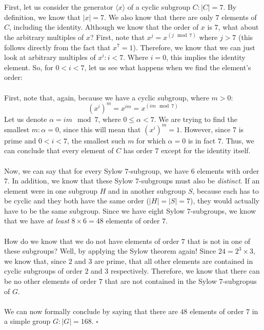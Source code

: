 \documentclass[letterpaper]{article}
\newcommand*{\QED}{\hfill\ensuremath{\square}}%
\begin{document}
\\ \\
First, let us consider the generator $ \langle x \rangle $ of a cyclic subgroup $ C : |C| = 7 $.
By definition, we know that $ |x| = 7 $.
We also know that there are only $ 7 $ elements of $ C $, including the identity.
Although we know that the order of $ x $ is $ 7 $, what about the arbitrary multiples of $ x $?
First, note that $ x^j = x^{(j \mod{7})} $ where $ j > 7 $ (this follows directly from the fact that $ x^7 = 1 $).
Therefore, we know that we can just look at arbitrary multiples of $ x^i : i < 7 $.
Where $ i = 0 $, this implies the identity element.
So, for $ 0 < i < 7 $, let us see what happens when we find the element's order:
\\ \\
First, note that, again, because we have a cyclic subgroup, where $ m > 0 $:
\[
{(x^i)}^m = x^{im} = x^{(im \mod{7})}
\]
Let us denote $ \alpha = im \mod{7} $, where $ 0 \leq \alpha < 7 $.
We are trying to find the smallest $ m : \alpha = 0 $, since this will mean that $ {(x^i)}^m = 1 $.
However, since $ 7 $ is prime and $ 0 < i < 7 $, the smallest such $ m $ for which $ \alpha = 0 $ is in fact $ 7 $.
Thus, we can conclude that every element of $ C $ has order $ 7 $ except for the identity itself.
\\ \\
Now, we can say that for every Sylow $ 7 $-subgroup, we have $ 6 $ elements with order $ 7 $.
In addition, we know that these Sylow $ 7 $-subgroups must also be \textit{distinct}.
If an element were in one subgroup $ H $ and in another subgroup $ S $, because each has to be cyclic and they both have the same order ($ |H| = |S| = 7 $), they would actually have to be the same subgroup.
Since we have eight Sylow $ 7 $-subgroups, we know that we have \textit{at least} $ 8 \times 6 = 48 $ elements of order $ 7 $.
\\ \\
How do we know that we do not have elements of order $ 7 $ that is not in one of these subgroups?
Well, by applying the Sylow theorem again!
Since $ 24 = 2^3 \times 3 $, we know that, since $ 2 $ and $ 3 $ are prime, that all other elements are contained in cyclic subgroups of order $ 2 $ and $ 3 $ respectively.
Therefore, we know that there can be no other elements of order $ 7 $ that are not contained in the Sylow $ 7 $-subgropus of $ G $.
\\ \\
We can now formally conclude by saying that there are $ 48 $ elements of order $ 7 $ in a simple group $ G : |G| = 168 $.
\QED{}
\end{document}
